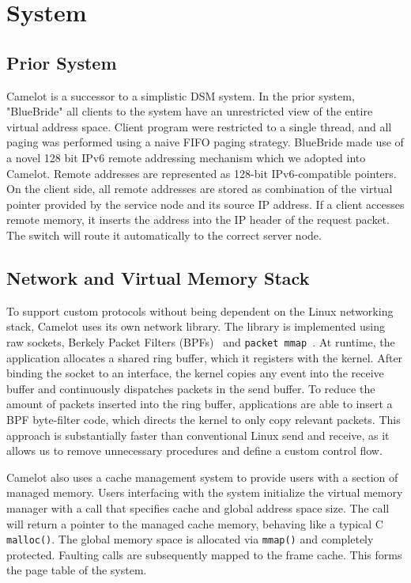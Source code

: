 \section{System}
\label{sec:system}

\subsection{Prior System} Camelot is a successor to a
simplistic DSM system. In the prior system, "BlueBride" all clients to the
system have an unrestricted view of the entire virtual address space.
Client program were restricted to a single thread, and all paging was
performed using a naive FIFO paging strategy. BlueBride made use of a
novel 128 bit IPv6 remote addressing mechanism which we adopted into
Camelot. Remote addresses are represented as 128-bit IPv6-compatible
pointers. On the client side, all remote addresses are stored as
combination of the virtual pointer provided by the service node and
its source IP address. If a client accesses remote memory, it inserts
the address into the IP header of the request packet. The switch will
route it automatically to the correct server node.

\subsection{Network and Virtual Memory Stack}
To support custom protocols without being dependent on the Linux networking stack, Camelot uses its own network library. The library is implemented using raw sockets, Berkely Packet Filters (BPFs)~\cite{bpf} and \texttt{packet mmap}~\cite{packet_mmap}.
At runtime, the application allocates a shared ring buffer, which it registers with the kernel.  After binding the socket to an interface, the kernel copies any event into the receive buffer and continuously dispatches packets in the send buffer. To reduce the amount of packets inserted into the ring buffer, applications are able to insert a BPF byte-filter code, which directs the kernel to only copy relevant packets. This approach is substantially faster than conventional Linux send and receive, as it allows us to remove unnecessary procedures and define a custom control flow.

Camelot also uses a cache management system to provide users with a section of managed memory. Users interfacing with the system initialize the virtual memory manager with a call that specifies cache and global address space size. The call will return a pointer to the managed cache memory, behaving like a typical C \texttt{malloc()}. The global memory space is allocated via \texttt{mmap()} and completely protected. Faulting calls are subsequently mapped to the frame cache. This forms the page table of the system. 

